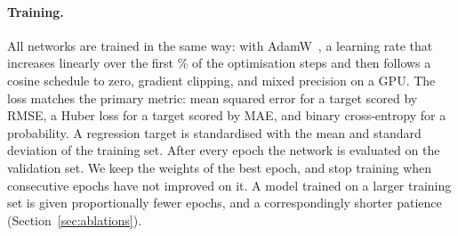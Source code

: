 \paragraph{Training.}
All networks are trained in the same way: with AdamW~\cite{adamw}, a learning
rate that increases linearly over the first \% of
the optimisation steps and then follows a cosine schedule to zero, gradient
clipping, and mixed precision on a GPU. The loss matches the primary metric:
mean squared error for a target scored by RMSE, a Huber loss for a target
scored by MAE, and binary cross-entropy for a probability. A regression
target is standardised with the mean and standard deviation of the training
set. After every epoch the network is evaluated on the validation set. We
keep the weights of the best epoch, and stop training when
 consecutive epochs have not improved on it.
\ifmore
A model trained on a larger training set is given proportionally fewer
epochs, and a correspondingly shorter patience
(Section~\ref{sec:ablations}).
\fi

\begin{table}[htbp]\centering\footnotesize
{}
\caption{The models, best first. \emph{Selected} is the number of trees or
the training epoch chosen on the validation set. \emph{Time} is the total
wall-clock time for training and evaluation.}
\label{tab:runs}
\end{table}
